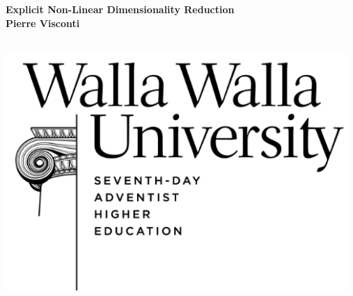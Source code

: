 \documentclass[a0,landscape]{a0poster}
\begin{document}


\begin{minipage}[b]{0.88\linewidth}
\veryHuge \color{DarkSlateGray} \textbf{Explicit Non-Linear Dimensionality Reduction} \color{Black}\\ %
\huge \textbf{Pierre Visconti}\\ %
\huge {}\\
\end{minipage}
%
\begin{minipage}[b]{0.12\linewidth}
\includegraphics[width=13cm]{wwu.png} %
\end{minipage}

\end{document}
